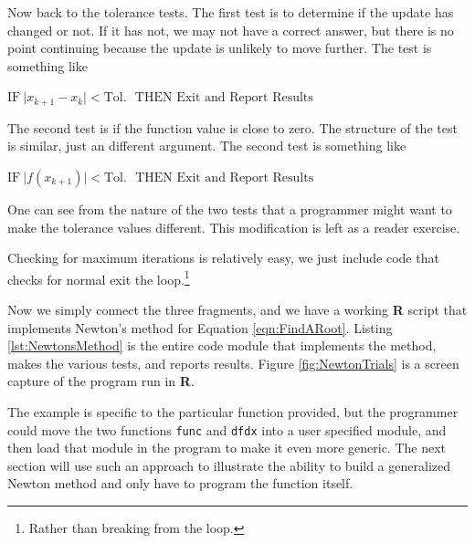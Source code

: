 Now back to the tolerance tests. The first test is to determine if the update has changed or not.   If it has not, we may not have a correct answer, but there is no point continuing because the update is unlikely to move further.   The test is something like

\begin{math}
\text{IF}~\lvert x_{k+1} - x_{k} \rvert < \text{Tol.~ THEN Exit and Report Results}
\end{math}  

The second test is if the function value is close to zero.   The structure of the test is similar, just an different argument.   The second test is something like

\begin{math}
\text{IF}~\lvert f(x_{k+1}) \rvert < \text{Tol.~ THEN Exit and Report Results}
\end{math} 

One can see from the nature of the two tests that a programmer might want to make the tolerance values different.   This modification is left as a reader exercise.

Checking for maximum iterations is relatively easy, we just include code that checks for normal exit the loop.\footnote{Rather than breaking from the loop.}

Now we simply connect the three fragments, and we have a working \textbf{R} script that implements Newton's method for Equation \ref{eqn:FindARoot}.  
Listing \ref{lst:NewtonsMethod} is the entire code module that implements the method, makes the various tests, and reports results.
Figure \ref{fig:NewtonTrials} is a screen capture of the program run in \textbf{R}.

The example is specific to the particular function provided, but the programmer could move the two functions \texttt{func} and \texttt{dfdx} into a user specified module, and then load that module in the program to make it even more generic.   The next section will use such an approach to illustrate the ability to build a generalized Newton method and only have to program the function itself.

